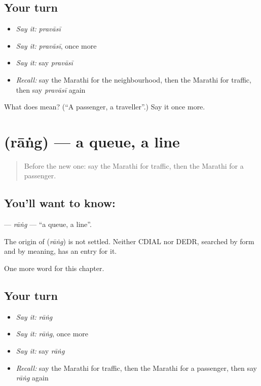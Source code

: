 \subsection*{Your turn}
\begin{itemize}
\raggedright
  \item \emph{Say it:} \emph{pravāsī}
  \item \emph{Say it:} \emph{pravāsī}, once more
  \item \emph{Say it:} say \emph{pravāsī}
  \item \emph{Recall:} say the Marathi for the neighbourhood, then the Marathi for traffic, then say \emph{pravāsī} again
\end{itemize}

\begin{tcolorbox}[breakable,colback=teal!4,colframe=teal!35!black,title={Before you move on}]
What does  mean? (\textquotedblleft{}A passenger, a traveller\textquotedblright{}.) Say it once more.
\end{tcolorbox}
\section[\texorpdfstring{\mr{रांग} (rāṅg)}{रांग (rāṅg)}]{ (rāṅg) — a queue, a line}

\label{lesson:MR-C190-rang}



\begin{quote}
Before the new one: say the Marathi for traffic, then the Marathi for a passenger.
\end{quote}

\subsection*{You'll want to know: }
\textbf{} — \emph{rāṅg} — \textquotedblleft{}a queue, a line\textquotedblright{}.

\begin{cousinweb}
The origin of \textbf{} (\emph{rāṅg}) is not settled. Neither CDIAL nor DEDR, searched by form and by meaning, has an entry for it.
\end{cousinweb}

\begin{grammarlens}[title={What you've built}]
One more word for this chapter.
\end{grammarlens}

\subsection*{Your turn}
\begin{itemize}
\raggedright
  \item \emph{Say it:} \emph{rāṅg}
  \item \emph{Say it:} \emph{rāṅg}, once more
  \item \emph{Say it:} say \emph{rāṅg}
  \item \emph{Recall:} say the Marathi for traffic, then the Marathi for a passenger, then say \emph{rāṅg} again
\end{itemize}

